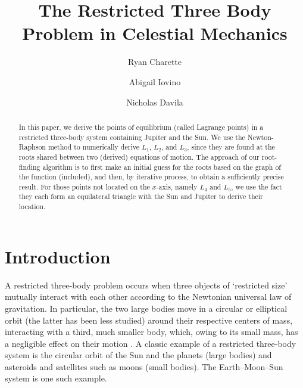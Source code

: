 \documentclass[linenumbers,RNAAS,trackchanges]{aastex631}
\begin{document}
\title{The Restricted Three Body Problem in Celestial Mechanics}
\author[0000-0000-0000-0000]{Ryan Charette}
\author[0000-0000-0000-0000]{Abigail Iovino}
\author[0000-0000-0000-0000]{Nicholas Davila}




\begin{abstract}
In this paper, we derive the points of equilibrium (called Lagrange points) in a restricted three-body system containing Jupiter and the Sun. We use the Newton-Raphson method to numerically derive $L_1$, $L_2$, and $L_3$, since they are found at the roots shared between two (derived) equations of motion. The approach of our root-finding algorithm is to first make an initial guess for the roots based on the graph of the function (included), and then, by iterative process, to obtain a sufficiently precise result. For those points not located on the $x$-axis, namely $L_4$ and $L_5$, we use the fact they each form an equilateral triangle with the Sun and Jupiter to derive their location. 
\end{abstract}



\section{\textbf{Introduction}} \label{sec:intro}

A restricted three-body problem occurs when three objects of ‘restricted size’ mutually interact with each other according to the Newtonian universal law of gravitation. In particular, the two large bodies move in a circular or elliptical orbit (the latter has been less studied) around their respective centers of mass, interacting with a third, much smaller body, which, owing to its small mass, has a negligible effect on their motion \cite[2]{Musielak_Quarles_2015}. A classic example of a restricted three-body system is the circular orbit of the Sun and the planets (large bodies) and asteroids and satellites such as moons (small bodies). The Earth–Moon–Sun system is one such example. 
\end{document}
